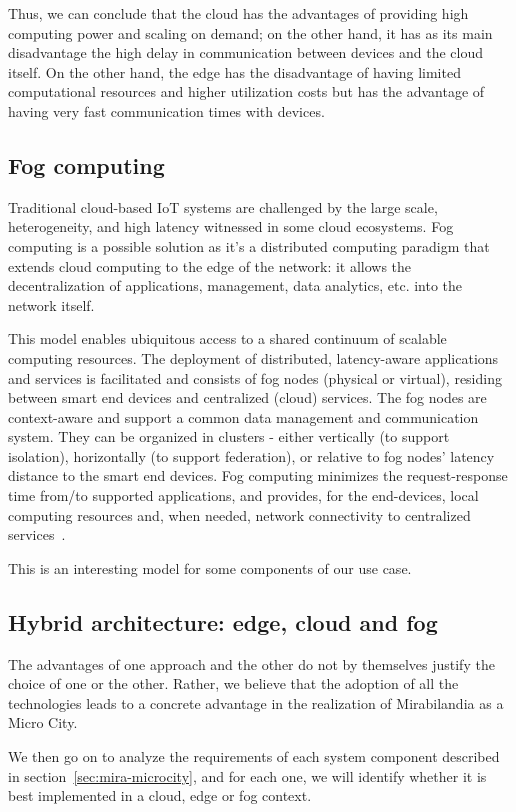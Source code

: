 Thus, we can conclude that the cloud has the advantages of providing high computing power and scaling on demand; on the other hand, it has as its
main disadvantage the high delay in communication between devices and the cloud itself. On the other hand, the edge has the disadvantage of having
limited computational resources and higher utilization costs but has the advantage of having very fast communication times with devices.

\subsection{Fog computing}
Traditional cloud-based IoT systems are challenged by the large scale, heterogeneity, and high latency witnessed in some cloud ecosystems. 
Fog computing is a possible solution as it's a distributed computing paradigm that extends cloud computing to the edge of the network:
it allows the decentralization of applications, management, data analytics, etc. into the network itself.

This model enables ubiquitous access to a shared continuum of scalable computing resources.
The deployment of distributed, latency-aware applications and services is facilitated and consists of fog nodes (physical or virtual), residing between smart end devices and centralized (cloud) services.
The fog nodes are context-aware and support a common data management and communication system.
They can be organized in clusters - either vertically (to support isolation), horizontally (to support federation), or relative to fog nodes' latency distance to the smart end devices. Fog computing minimizes the request-response time from/to supported applications, and provides, for the end-devices, local computing resources and, when needed, network connectivity to centralized services~\cite{iorga2018fog}.

This is an interesting model for some components of our use case.

\subsection{Hybrid architecture: edge, cloud and fog}
The advantages of one approach and the other do not by themselves justify the choice of one or the other. Rather, we believe that the adoption of all the technologies leads to a concrete advantage in the realization of Mirabilandia as a Micro City.

We then go on to analyze the requirements of each system component described in section~\ref{sec:mira-microcity}, and for each one, we will identify whether it is best implemented in a cloud, edge or fog context.

